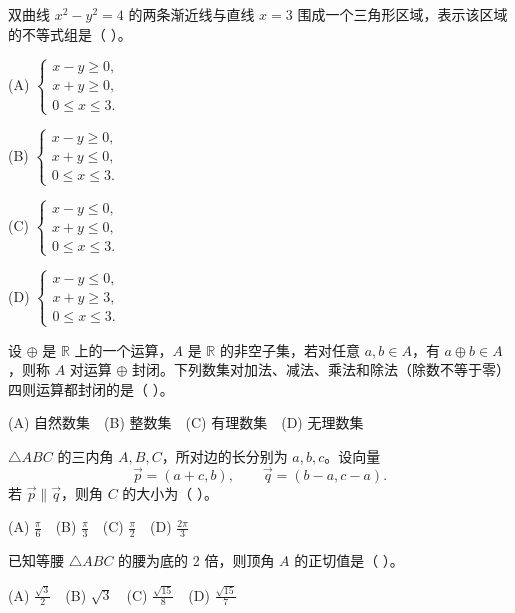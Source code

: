 \begin{question}
双曲线 \(x^2-y^2=4\) 的两条渐近线与直线 \(x=3\) 围成一个三角形区域，表示该区域的不等式组是（ ）。

(A) \(\begin{cases}x-y\ge 0,\\x+y\ge 0,\\0\le x\le 3.\end{cases}\)

(B) \(\begin{cases}x-y\ge 0,\\x+y\le 0,\\0\le x\le 3.\end{cases}\)

(C) \(\begin{cases}x-y\le 0,\\x+y\le 0,\\0\le x\le 3.\end{cases}\)

(D) \(\begin{cases}x-y\le 0,\\x+y\ge 3,\\0\le x\le 3.\end{cases}\)

\end{question}
\begin{question}
设 \(\oplus\) 是 \(\mathbb R\) 上的一个运算，\(A\) 是 \(\mathbb R\) 的非空子集，若对任意 \(a,b\in A\)，有 \(a\oplus b\in A\)，则称 \(A\) 对运算 \(\oplus\) 封闭。下列数集对加法、减法、乘法和除法（除数不等于零）四则运算都封闭的是（ ）。

(A) 自然数集　(B) 整数集　(C) 有理数集　(D) 无理数集

\end{question}
\begin{question}
\(\triangle ABC\) 的三内角 \(A,B,C\)，所对边的长分别为 \(a,b,c\)。设向量
\nopagebreak[4]
\[
\vec p=(a+c,b),\qquad \vec q=(b-a,c-a).
\]
若 \(\vec p\parallel\vec q\)，则角 \(C\) 的大小为（ ）。

(A) \(\frac\pi6\)　(B) \(\frac\pi3\)　(C) \(\frac\pi2\)　(D) \(\frac{2\pi}3\)

\end{question}
\begin{question}
已知等腰 \(\triangle ABC\) 的腰为底的 2 倍，则顶角 \(A\) 的正切值是（ ）。

(A) \(\frac{\sqrt3}{2}\)　(B) \(\sqrt3\)　(C) \(\frac{\sqrt{15}}8\)　(D) \(\frac{\sqrt{15}}7\)

\end{question}
